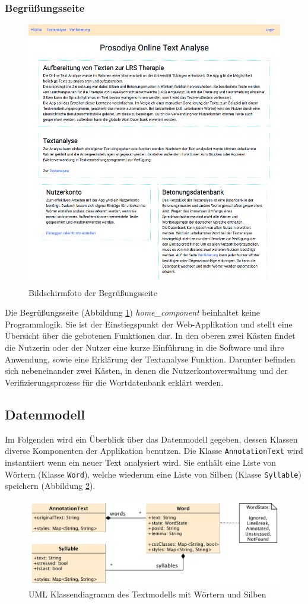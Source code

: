 \subsubsection{Begrüßungsseite}

\begin{figure}[h!]
	\centering
	\includegraphics[width=.6\linewidth, frame]{figures/frontend/home}
	\caption{Bildschirmfoto der Begrüßungsseite}
	\label{fig:frontend-home}
\end{figure}

Die Begrüßungsseite (Abbildung \ref{fig:frontend-home}) \textit{home\_component} beinhaltet keine Programmlogik. Sie ist der Einstiegspunkt der Web-Applikation und stellt eine Übersicht über die gebotenen Funktionen dar. In den oberen zwei Kästen findet die Nutzerin oder der Nutzer eine kurze Einführung in die Software und ihre Anwendung, sowie eine Erklärung der Textanalyse Funktion. Darunter befinden sich nebeneinander zwei Kästen, in denen die Nutzerkontoverwaltung und der Verifizierungsprozess für die Wortdatenbank erklärt werden.

\subsection{Datenmodell}

Im Folgenden wird ein Überblick über das Datenmodell gegeben, dessen Klassen diverse Komponenten der Applikation benutzen. Die Klasse \texttt{AnnotationText} wird instantiiert wenn ein neuer Text analysiert wird. Sie
enthält eine Liste von Wörtern (Klasse \texttt{Word}), welche wiederum eine Liste von Silben (Klasse \texttt{Syllable}) speichern (Abbildung \ref{fig:frontendmodel}). \\

\begin{figure}[h!]
	\centering
	\includegraphics[width=.8\linewidth]{figures/frontend/uml-annotationtext}
	\caption{UML Klassendiagramm des Textmodells mit Wörtern und Silben}
	\label{fig:frontendmodel}
\end{figure}


